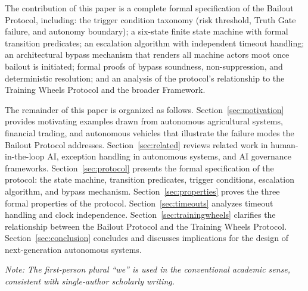 The contribution of this paper is a complete formal specification of the Bailout Protocol, including: the trigger condition taxonomy (risk threshold, Truth Gate failure, and autonomy boundary); a six-state finite state machine with formal transition predicates; an escalation algorithm with independent timeout handling; an architectural bypass mechanism that renders all machine actors moot once bailout is initiated; formal proofs of bypass soundness, non-suppression, and deterministic resolution; and an analysis of the protocol's relationship to the Training Wheels Protocol and the broader \bxthree Framework.

The remainder of this paper is organized as follows. Section~\ref{sec:motivation} provides motivating examples drawn from autonomous agricultural systems, financial trading, and autonomous vehicles that illustrate the failure modes the Bailout Protocol addresses. Section~\ref{sec:related} reviews related work in human-in-the-loop AI, exception handling in autonomous systems, and AI governance frameworks. Section~\ref{sec:protocol} presents the formal specification of the protocol: the state machine, transition predicates, trigger conditions, escalation algorithm, and bypass mechanism. Section~\ref{sec:properties} proves the three formal properties of the protocol. Section~\ref{sec:timeouts} analyzes timeout handling and clock independence. Section~\ref{sec:trainingwheels} clarifies the relationship between the Bailout Protocol and the Training Wheels Protocol. Section~\ref{sec:conclusion} concludes and discusses implications for the design of next-generation autonomous systems.

\medskip
\noindent\textit{Note: The first-person plural ``we'' is used in the conventional academic sense, consistent with single-author scholarly writing.}


